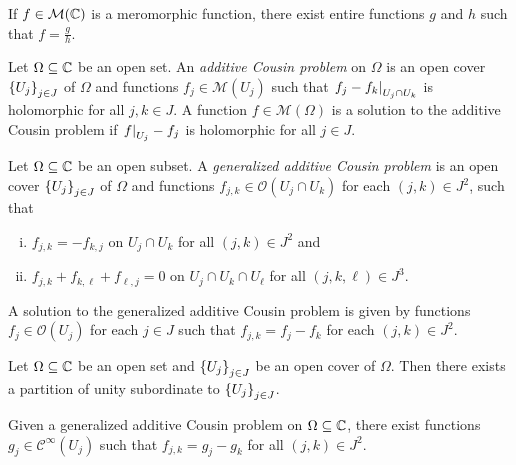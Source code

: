 \begin{izrek}
If $f \in \mathcal{M}(\mathbb{C})$ is a meromorphic function, there exist
entire functions $g$ and $h$ such that $f = \frac{g}{h}$.
\end{izrek}

\begin{definicija}
Let $\Omega \subseteq \mathbb{C}$ be an open set. An
\emph{additive Cousin problem} on
$\Omega$ is an open cover $\left\{U_j\right\}_{j \in J}$ of $\Omega$ and
functions $f_j \in \mathcal{M}(U_j)$ such that
$\left. f_j - f_k\right|_{U_j \cap U_k}^{}$ is holomorphic for all
$j, k \in J$. A function $f \in \mathcal{M}(\Omega)$ is a solution
to the additive Cousin problem if $\left. f\right|_{U_j}^{} - f_j$ is
holomorphic for all $j \in J$.
\end{definicija}

\begin{definicija}
Let $\Omega \subseteq \mathbb{C}$ be an open subset. A
\emph{generalized additive Cousin problem}
is an open cover $\left\{U_j\right\}_{j \in J}$ of $\Omega$ and functions
$f_{j,k} \in \mathcal{O}(U_j \cap U_k)$ for each $(j,k) \in J^2$,
such that

\begin{enumerate}[i)]
\item $f_{j,k} = -f_{k,j}$ on $U_j \cap U_k$ for all
$(j, k) \in J^2$ and
\item $f_{j,k} + f_{k, \ell} + f_{\ell, j} = 0$ on
$U_j \cap U_k \cap U_\ell$ for all $(j, k, \ell) \in J^3$.
\end{enumerate}

A solution to the generalized additive Cousin problem is given by
functions $f_j \in \mathcal{O}(U_j)$ for each $j \in J$ such that
$f_{j,k} = f_j - f_k$ for each $(j, k) \in J^2$.
\end{definicija}


\begin{lema}
Let $\Omega \subseteq \mathbb{C}$ be an open set and $\left\{U_j\right\}_{j \in J}$
be an open cover of $\Omega$. Then there exists a partition of
unity subordinate to $\left\{U_j\right\}_{j \in J}$.
\end{lema}

\begin{lema}
Given a generalized additive Cousin problem on
$\Omega \subseteq \mathbb{C}$, there exist functions
$g_j \in \mathcal{C}^\infty(U_j)$ such that $f_{j,k} = g_j - g_k$
for all $(j, k) \in J^2$.
\end{lema}

